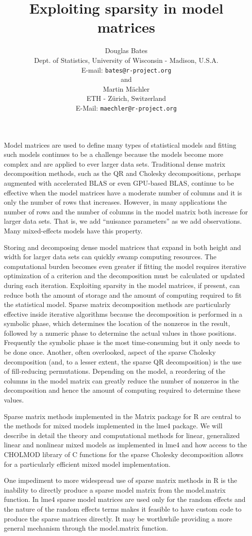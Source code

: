 \documentclass[12pt,a4paper]{article}
\title{Exploiting sparsity in model matrices}
\author{
  Douglas Bates\\
  Dept. of Statistics, University of Wisconsin - Madison, U.S.A.\\
  E-mail: \texttt{bates@r-project.org}\\
  and\\
  Martin M\"{a}chler\\
  ETH - Z\"{u}rich, Switzerland\\
  E-Mail: \texttt{maechler@r-project.org}
}
\date{} %
\begin{document}
\maketitle\thispagestyle{empty} %
Model matrices are used to define many types of statistical models and
fitting such models continues to be a challenge because the models
become more complex and are applied to ever larger data sets.
Traditional dense matrix decomposition methods, such as the QR and
Cholesky decompositions, perhaps augmented with accelerated BLAS or
even GPU-based BLAS, continue to be effective when the model matrices
have a moderate number of columns and it is only the number of rows
that increases.  However, in many applications the number of rows
and the number of columns in the model matrix both increase for larger
data sets.  That is, we add ``nuisance parameters'' as we add
observations.  Many mixed-effects models have this property.

Storing and decomposing dense model matrices that expand in both
height and width for larger data sets can quickly swamp computing
resources.  The computational burden becomes even greater if fitting
the model requires iterative optimization of a criterion and the
decomposition must be calculated or updated during each iteration.
Exploiting sparsity in the model matrices, if present, can reduce both
the amount of storage and the amount of computing required to fit the
statistical model.  Sparse matrix decomposition methods are
particularly effective inside iterative algorithms because the
decomposition is performed in a symbolic phase, which determines the
location of the nonzeros in the result, followed by a numeric phase to
determine the actual values in those positions.  Frequently the
symbolic phase is the most time-consuming but it only needs to be done
once.  Another, often overlooked, aspect of the sparse Cholesky
decomposition (and, to a lesser extent, the sparse QR decomposition)
is the use of fill-reducing permutations.  Depending on the model, a
reordering of the columns in the model matrix can greatly reduce the
number of nonzeros in the decomposition and hence the amount of computing
required to determine these values.

Sparse matrix methods implemented in the Matrix package for R are
central to the methods for mixed models implemented in the lme4
package.  We will describe in detail the theory and computational
methods for linear, generalized linear and nonlinear mixed models as
implemented in lme4 and how access to the CHOLMOD library of C
functions for the sparse Cholesky decomposition allows for a
particularly efficient mixed model implementation.  

One impediment to more widespread use of sparse matrix methods in R is
the inability to directly produce a sparse model matrix from the
model.matrix function.  In lme4 sparse model matrices are used only
for the random effects and the nature of the random effects terms
makes it feasible to have custom code to produce the sparse matrices
directly.  It may be worthwhile providing a more general mechanism
through the model.matrix function.
\end{document}
